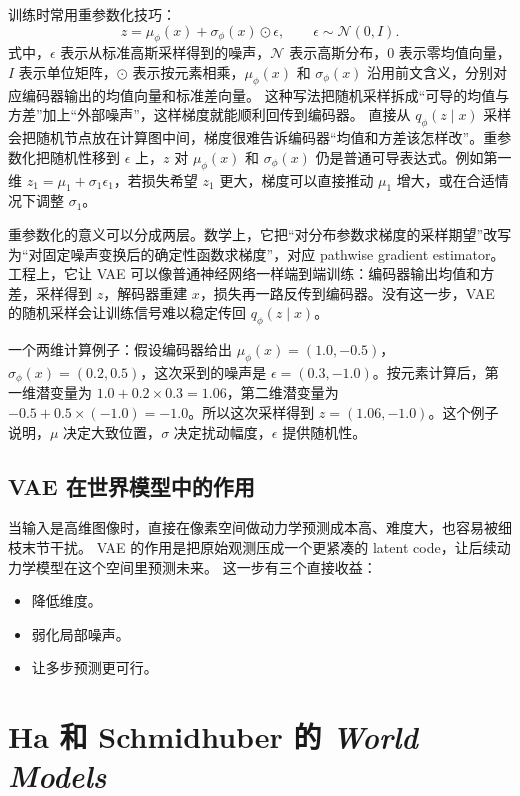 \documentclass[11pt,a4paper]{ctexart}
\begin{document}
训练时常用重参数化技巧：
\begin{equation}
  z = \mu_\phi(x) + \sigma_\phi(x)\odot \epsilon,\qquad \epsilon\sim\mathcal N(0,I).
\end{equation}
式中，$\epsilon$ 表示从标准高斯采样得到的噪声，$\mathcal N$ 表示高斯分布，$0$ 表示零均值向量，$I$ 表示单位矩阵，$\odot$ 表示按元素相乘，$\mu_\phi(x)$ 和 $\sigma_\phi(x)$ 沿用前文含义，分别对应编码器输出的均值向量和标准差向量。
这种写法把随机采样拆成“可导的均值与方差”加上“外部噪声”，这样梯度就能顺利回传到编码器。
直接从 $q_\phi(z\mid x)$ 采样会把随机节点放在计算图中间，梯度很难告诉编码器“均值和方差该怎样改”。重参数化把随机性移到 $\epsilon$ 上，$z$ 对 $\mu_\phi(x)$ 和 $\sigma_\phi(x)$ 仍是普通可导表达式。例如第一维 $z_1=\mu_1+\sigma_1\epsilon_1$，若损失希望 $z_1$ 更大，梯度可以直接推动 $\mu_1$ 增大，或在合适情况下调整 $\sigma_1$。

重参数化的意义可以分成两层。数学上，它把“对分布参数求梯度的采样期望”改写为“对固定噪声变换后的确定性函数求梯度”，对应 pathwise gradient estimator。工程上，它让 VAE 可以像普通神经网络一样端到端训练：编码器输出均值和方差，采样得到 $z$，解码器重建 $x$，损失再一路反传到编码器。没有这一步，VAE 的随机采样会让训练信号难以稳定传回 $q_\phi(z\mid x)$。

一个两维计算例子：假设编码器给出 $\mu_\phi(x)=(1.0,-0.5)$，$\sigma_\phi(x)=(0.2,0.5)$，这次采到的噪声是 $\epsilon=(0.3,-1.0)$。按元素计算后，第一维潜变量为 $1.0+0.2\times 0.3=1.06$，第二维潜变量为 $-0.5+0.5\times(-1.0)=-1.0$。所以这次采样得到 $z=(1.06,-1.0)$。这个例子说明，$\mu$ 决定大致位置，$\sigma$ 决定扰动幅度，$\epsilon$ 提供随机性。

\subsection{VAE 在世界模型中的作用}

当输入是高维图像时，直接在像素空间做动力学预测成本高、难度大，也容易被细枝末节干扰。
VAE 的作用是把原始观测压成一个更紧凑的 latent code，让后续动力学模型在这个空间里预测未来。
这一步有三个直接收益：

\begin{itemize}
  \item 降低维度。
  \item 弱化局部噪声。
  \item 让多步预测更可行。
\end{itemize}

\section{Ha 和 Schmidhuber 的 \emph{World Models}}
\end{document}
